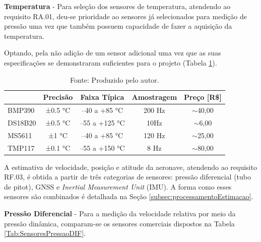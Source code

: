 \textbf{Temperatura} - Para seleção dos sensores de temperatura, atendendo ao requisito RA.01, deu-se prioridade ao sensores já selecionados para medição de pressão uma vez que também possuem capacidade de fazer a aquisição da temperatura.

Optando, pela não adição de um sensor adicional uma vez que as suas especificações se demonstraram suficientes para o projeto (Tabela \ref{Tab:SensoresTemp}).

\begin{table}[H]
\centering
\caption{Sensores de temperatura analisados.}
\begin{tabular}{|l|c|c|c|c|}
\hline
\rowcolor[HTML]{C0C0C0} 
\multicolumn{1}{|c|}{\cellcolor[HTML]{C0C0C0}\textbf{Sensor}} & \textbf{Precisão}               & \textbf{Faixa Típica} & \textbf{Amostragem} & \multicolumn{1}{l|}{\cellcolor[HTML]{C0C0C0}\textbf{Preço {[}R\${]}}} \\ \hline
\cellcolor[HTML]{FFFFFF}BMP390               & \cellcolor[HTML]{FFFFFF}±0.5 °C & –40 a +85 °C          & 200 Hz              & $\sim$40,00                                                           \\ \hline
DS18B20                                              & ±0.5 °C                         & –55 a +125 °C         & 10Hz                & $\sim$6,00                                                            \\ \hline
MS5611                                       & ±1 °C                           & –40 a +85 °C          & 120 Hz              & $\sim$25,00                                                           \\ \hline
TMP117                                               & ±0.1 °C                         & –55 a +150 °C         & 8 Hz                & $\sim$80,00                                                           \\ \hline
\end{tabular}
\label{Tab:SensoresTemp}
\caption*{Fonte: Produzido pelo autor.}
\end{table}

 A estimativa de velocidade, posição e atitude da aeronave, atendendo ao requisito RF.03, é obtida a partir de três categorias de sensores: pressão diferencial (tubo de pitot), GNSS e \textit{Inertial Measurement Unit} (IMU). A forma como esses sensores são combinados é detalhada na Seção \ref{subsec:processamentoEstimacao}.

\textbf{Pressão Diferencial} - Para a medição da velocidade relativa por meio da pressão dinâmica, comparam-se os sensores comerciais dispostos na Tabela \ref{Tab:SensoresPressaoDIF}.

